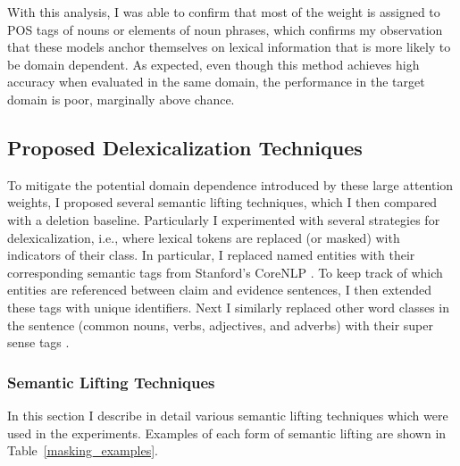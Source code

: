 \documentclass{article}
\begin{document}
 With this analysis, I was able to confirm that most of the weight is assigned to POS tags of nouns or elements of noun phrases, which confirms my observation that these models anchor themselves on lexical information that is more likely to be domain dependent. 
 As expected, even though this method achieves high accuracy when evaluated in the same domain, the performance in the target domain is poor, marginally above chance.






\subsection{Proposed Delexicalization Techniques}

To mitigate the potential domain dependence introduced by these large attention weights, I proposed several semantic lifting techniques, which I then compared with a deletion baseline.  
Particularly I experimented with several strategies for delexicalization, i.e., where lexical tokens are replaced (or masked) with indicators of their class. In particular, I replaced named entities with their corresponding semantic tags from Stanford's CoreNLP \citep*{manning2014stanford}. To keep track of which entities are referenced between claim and evidence sentences, I then extended these tags with unique identifiers. Next I similarly replaced other word classes in the sentence (common nouns, verbs, adjectives, and adverbs)  with their super sense tags \citep*{ciaramita2003supersense}.




\subsubsection{Semantic Lifting Techniques} \label{masking_techniques}
In this section I describe in detail various semantic lifting techniques which were used in the experiments. Examples of each form of semantic lifting are shown in Table~\ref{masking_examples}.
\end{document}
